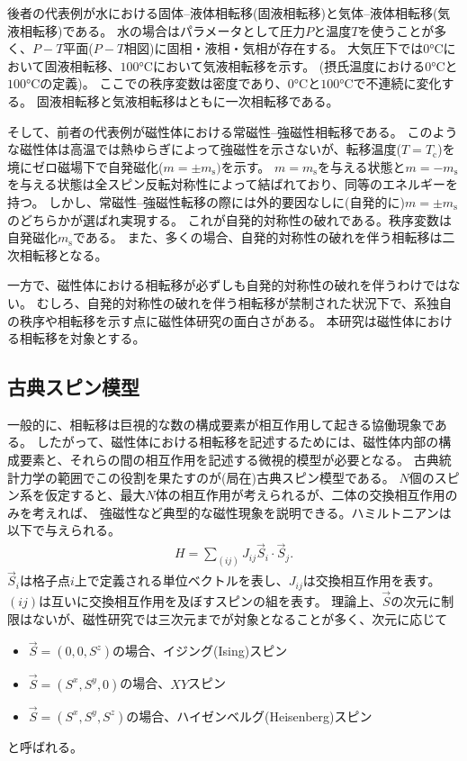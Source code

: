 \documentclass[12pt,titlepage,dvipdfmx]{jarticle}
\begin{document}
後者の代表例が水における固体--液体相転移(固液相転移)と気体--液体相転移(気液相転移)である。
水の場合はパラメータとして圧力$P$と温度$T$を使うことが多く、$P-T$平面($P-T$相図)に固相・液相・気相が存在する。
大気圧下では$0\si{\degreeCelsius}$において固液相転移、$100\si{\degreeCelsius}$において気液相転移を示す。
(摂氏温度における$0\si{\degreeCelsius}$と$100\si{\degreeCelsius}$の定義)。
ここでの秩序変数は密度であり、$0\si{\degreeCelsius}$と$100\si{\degreeCelsius}$で不連続に変化する。
固液相転移と気液相転移はともに一次相転移である。

そして、前者の代表例が磁性体における常磁性--強磁性相転移である。
このような磁性体は高温では熱ゆらぎによって強磁性を示さないが、転移温度($T=T_{\mathrm{c}}$)を境にゼロ磁場下で自発磁化($m=\pm m_{\mathrm{s}})$を示す。
$m=m_{\mathrm{s}}$を与える状態と$m=-m_{\mathrm{s}}$を与える状態は全スピン反転対称性によって結ばれており、同等のエネルギーを持つ。
しかし、常磁性--強磁性転移の際には外的要因なしに(自発的に)$m=\pm m_{\mathrm{s}}$のどちらかが選ばれ実現する。
これが自発的対称性の破れである。秩序変数は自発磁化$m_{\mathrm{s}}$である。
また、多くの場合、自発的対称性の破れを伴う相転移は二次相転移となる。

一方で、磁性体における相転移が必ずしも自発的対称性の破れを伴うわけではない。
むしろ、自発的対称性の破れを伴う相転移が禁制された状況下で、系独自の秩序や相転移を示す点に磁性体研究の面白さがある。
本研究は磁性体における相転移を対象とする。

\subsection{{古典スピン模型}}
一般的に、相転移は巨視的な数の構成要素が相互作用して起きる協働現象である。
したがって、磁性体における相転移を記述するためには、磁性体内部の構成要素と、それらの間の相互作用を記述する微視的模型が必要となる。
古典統計力学の範囲でこの役割を果たすのが(局在)古典スピン模型である。
$N$個のスピン系を仮定すると、最大$N$体の相互作用が考えられるが、二体の交換相互作用のみを考えれば、
強磁性など典型的な磁性現象を説明できる。ハミルトニアンは以下で与えられる。
\begin{align}
   H = \sum_{(ij)} J_{ij} \vec{S}_i\cdot \vec{S}_j.
\end{align}
$\vec{S}_i$は格子点$i$上で定義される単位ベクトルを表し、$J_{ij}$は交換相互作用を表す。
$(ij)$は互いに交換相互作用を及ぼすスピンの組を表す。
理論上、$\vec{S}$の次元に制限はないが、磁性研究では三次元までが対象となることが多く、次元に応じて
\begin{itemize}
   \item $\vec{S}=(0,0,S^z)$の場合、イジング(Ising)スピン
   \item $\vec{S}=(S^x,S^y,0)$の場合、$XY$スピン
   \item $\vec{S}=(S^x,S^y,S^z)$の場合、ハイゼンベルグ(Heisenberg)スピン
\end{itemize}
と呼ばれる。
\end{document}
